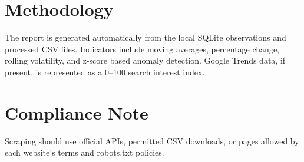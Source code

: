 \documentclass[11pt,a4paper]{article}
\begin{document}
\section*{Methodology}
The report is generated automatically from the local SQLite observations and processed CSV files. Indicators include moving averages, percentage change, rolling volatility, and z-score based anomaly detection. Google Trends data, if present, is represented as a 0--100 search interest index.

\section*{Compliance Note}
Scraping should use official APIs, permitted CSV downloads, or pages allowed by each website's terms and robots.txt policies.
\end{document}
